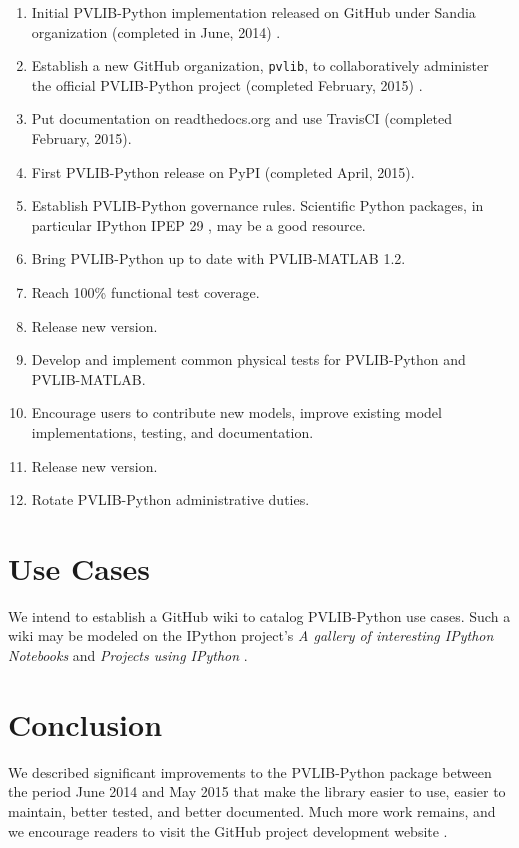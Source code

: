 \documentclass[conference]{IEEEtran}
\begin{document}
\begin{enumerate}
\item Initial PVLIB-Python implementation released on GitHub under Sandia organization (completed in June, 2014) \cite{sandia-github}.
\item Establish a new GitHub organization, \texttt{pvlib}, to collaboratively administer the official PVLIB-Python project (completed February, 2015) \cite{pvlib-github}.
\item Put documentation on readthedocs.org \cite{pvlib-rtd} and use TravisCI (completed February, 2015).
\item First PVLIB-Python release on PyPI \cite{pvlib-pypi} (completed April, 2015).
\item Establish PVLIB-Python governance rules. Scientific Python packages, in particular IPython IPEP 29 \cite{ipython-gov}, may be a good resource.
\item Bring PVLIB-Python up to date with PVLIB-MATLAB 1.2.
\item Reach 100\% functional test coverage.
\item Release new version.
\item Develop and implement common physical tests for PVLIB-Python and PVLIB-MATLAB.
\item Encourage users to contribute new models, improve existing model implementations, testing, and documentation.
\item Release new version.
\item Rotate PVLIB-Python administrative duties.
\end{enumerate}


\section{Use Cases}

We intend to establish a GitHub wiki to catalog PVLIB-Python use cases. Such a wiki may be modeled on the IPython project's \emph{A gallery of interesting IPython Notebooks} and \emph{Projects using IPython} \cite{ipythonwiki}. 


\section{Conclusion}
We described significant improvements to the PVLIB-Python package between the period June 2014 and May 2015 that make the library easier to use, easier to maintain, better tested, and better documented. 
Much more work remains, and we encourage readers to visit the GitHub project development website \cite{pvlib-github}.
\end{document}
